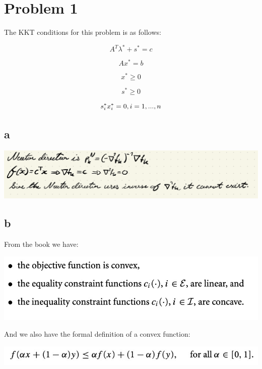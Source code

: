 \section{Problem 1}\label{problem1}
The KKT conditions for this problem is as follows: 

\begin{equation}
    A^T\lambda^*+s^*=c
\end{equation}

\begin{equation}
    Ax^*=b
\end{equation}

\begin{equation}
    x^*\geq0
\end{equation}

\begin{equation}
    s^*\geq0
\end{equation}

\begin{equation}
    s^*_ix^*_i=0, \space i = 1,...,n
\end{equation}

\subsection{a} \label{1a}
 
\includegraphics[width=1\linewidth]{Figures/1a.png}

\subsection{b} \label{1b}

From the book we have:

    \includegraphics[width=\linewidth]{Figures/1b_book.jpeg}

And we also have the formal definition of a convex function:

    \includegraphics[width=\linewidth]{Figures/1bdef.jpeg}



